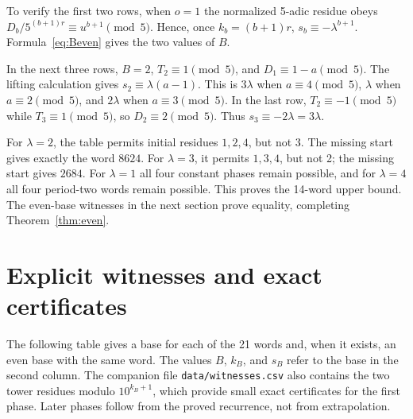 \documentclass[11pt,letterpaper]{article}
\numberwithin{equation}{section}
\theoremstyle{definition}
\begin{document}
To verify the first two rows, when $o=1$ the normalized 5-adic residue obeys
$D_b/5^{(b+1)r}\equiv u^{b+1}\pmod5$. Hence, once $k_b=(b+1)r$,
$s_b\equiv-\lambda^{b+1}$. Formula~\eqref{eq:Beven} gives the two values of
$B$.

In the next three rows, $B=2$, $T_2\equiv1\pmod5$, and
$D_1\equiv1-a\pmod5$. The lifting calculation gives
$s_2\equiv\lambda(a-1)$. This is $3\lambda$ when $a\equiv4\pmod5$,
$\lambda$ when $a\equiv2\pmod5$, and $2\lambda$ when $a\equiv3\pmod5$.
In the last row, $T_2\equiv-1\pmod5$ while $T_3\equiv1\pmod5$, so
$D_2\equiv2\pmod5$. Thus $s_3\equiv-2\lambda=3\lambda$.

For $\lambda=2$, the table permits initial residues $1,2,4$, but not 3.
The missing start gives exactly the word $8624$. For $\lambda=3$, it permits
$1,3,4$, but not 2; the missing start gives $2684$. For $\lambda=1$ all four
constant phases remain possible, and for $\lambda=4$ all four period-two
words remain possible. This proves the 14-word upper bound. The even-base
witnesses in the next section prove equality, completing
Theorem~\ref{thm:even}.

\section{Explicit witnesses and exact certificates}\label{sec:witnesses}
The following table gives a base for each of the 21 words and, when it exists,
an even base with the same word. The values $B$, $k_B$, and $s_B$ refer to the
base in the second column. The companion file \texttt{data/witnesses.csv}
also contains the two tower residues modulo $10^{k_B+1}$, which provide small
exact certificates for the first phase. Later phases follow from the proved
recurrence, not from extrapolation.
\end{document}
